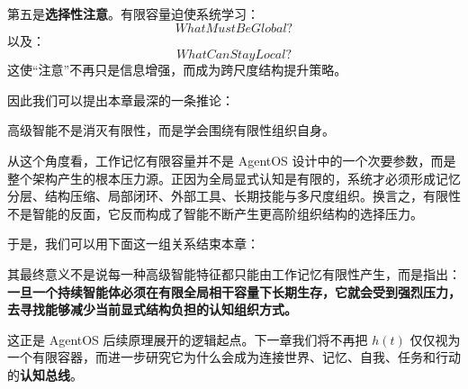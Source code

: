 第五是\textbf{选择性注意}。有限容量迫使系统学习：
\[
WhatMustBeGlobal?
\]
以及：
\[
WhatCanStayLocal?
\]
这使“注意”不再只是信息增强，而成为跨尺度结构提升策略。

因此我们可以提出本章最深的一条推论：
\begin{statementbox}
高级智能不是消灭有限性，而是学会围绕有限性组织自身。
\end{statementbox}

从这个角度看，工作记忆有限容量并不是 AgentOS 设计中的一个次要参数，而是整个架构产生的根本压力源。正因为全局显式认知是有限的，系统才必须形成记忆分层、结构压缩、局部闭环、外部工具、长期技能与多尺度组织。换言之，有限性不是智能的反面，它反而构成了智能不断产生更高阶组织结构的选择压力。

于是，我们可以用下面这一组关系结束本章：
\begin{statementbox}
\centering
{}
\end{statementbox}
其最终意义不是说每一种高级智能特征都只能由工作记忆有限性产生，而是指出：\textbf{一旦一个持续智能体必须在有限全局相干容量下长期生存，它就会受到强烈压力，去寻找能够减少当前显式结构负担的认知组织方式。}

这正是 AgentOS 后续原理展开的逻辑起点。下一章我们将不再把 $h(t)$ 仅仅视为一个有限容器，而进一步研究它为什么会成为连接世界、记忆、自我、任务和行动的\textbf{认知总线}。
